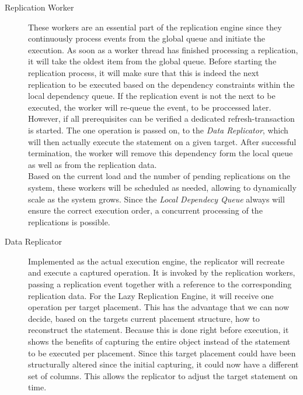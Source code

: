 \begin{description}
    \item[Replication Worker] These workers are an essential part of the replication engine since they continuously process events from the global queue 
    and initiate the execution. As soon as a worker thread has finished processing a replication, it will take the oldest item from the global queue. 
    Before starting the replication process, it will make sure that this is indeed the next replication to be executed based on the dependency constraints
    within the local dependency queue. If the replication event is not the next to be executed, the worker will re-queue the event, to be proccessed later.
    However, if all prerequisites can be verified a dedicated refresh-transaction is started.
    The one operation is passed on, to the \emph{Data Replicator}, which will then actually execute the statement on a given target.
    After successful termination, the worker will remove this dependency form the local queue as well as from the replication data. \\
    Based on the current load and the number of pending replications on the system, these workers will be scheduled as needed, allowing to dynamically scale as the system grows.
    Since the \emph{Local Dependecy Queue} always will ensure the correct execution order, a concurrent processing of the replications is possible.     
    


    \item[Data Replicator] Implemented as the actual execution engine, the replicator will recreate and execute a captured operation. 
    It is invoked by the replication workers, passing a replication event together with a reference to the corresponding replication data.
    For the Lazy Replication Engine, it will receive one operation per target placement. 
    This has the advantage that we can now decide, based on the targets current placement structure, how to reconstruct the statement. 
    Because this is done right before execution, it shows the benefits of capturing the entire object instead of the statement to be executed per placement. 
    Since this target placement could have been structurally altered since the initial capturing, it could now have a different set of columns. 
    This allows the replicator to adjust the target statement on time.
    
    




\end{description}
